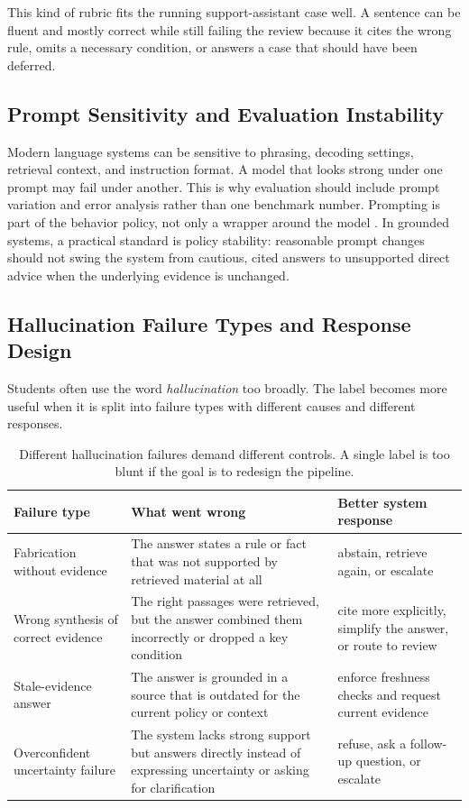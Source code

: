 This kind of rubric fits the running support-assistant case well. A sentence can be fluent and mostly correct while still failing the review because it cites the wrong rule, omits a necessary condition, or answers a case that should have been deferred.

\subsection{Prompt Sensitivity and Evaluation Instability}

Modern language systems can be sensitive to phrasing, decoding settings, retrieval context, and instruction format. A model that looks strong under one prompt may fail under another. This is why evaluation should include prompt variation and error analysis rather than one benchmark number. Prompting is part of the behavior policy, not only a wrapper around the model \citep{brown2020}. In grounded systems, a practical standard is policy stability: reasonable prompt changes should not swing the system from cautious, cited answers to unsupported direct advice when the underlying evidence is unchanged.

\subsection{Hallucination Failure Types and Response Design}

Students often use the word \emph{hallucination} too broadly. The label becomes more useful when it is split into failure types with different causes and different responses.

\begin{table}[t]
\centering
\small
\setlength{\tabcolsep}{4pt}
\begin{tabular}{@{}>{\raggedright\arraybackslash}p{2.5cm}>{\raggedright\arraybackslash}p{3.66cm}>{\raggedright\arraybackslash}p{4.08cm}@{}}
\toprule
Failure type & What went wrong & Better system response \\
\midrule
Fabrication without evidence & The answer states a rule or fact that was not supported by retrieved material at all & abstain, retrieve again, or escalate \\
Wrong synthesis of correct evidence & The right passages were retrieved, but the answer combined them incorrectly or dropped a key condition & cite more explicitly, simplify the answer, or route to review \\
Stale-evidence answer & The answer is grounded in a source that is outdated for the current policy or context & enforce freshness checks and request current evidence \\
Overconfident uncertainty failure & The system lacks strong support but answers directly instead of expressing uncertainty or asking for clarification & refuse, ask a follow-up question, or escalate \\
\bottomrule
\end{tabular}
\caption{Different hallucination failures demand different controls. A single label is too blunt if the goal is to redesign the pipeline.}
\label{tab:hallucination-failure-types}
\end{table}


